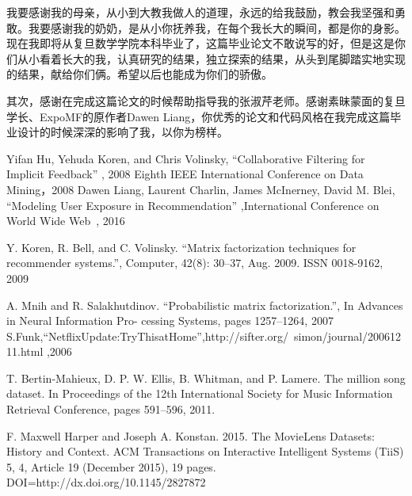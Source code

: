 \documentclass[notitlepage,cs4size,punct,oneside]{ctexrep}
\numberwithin{equation}{chapter}
\theoremstyle{mystyle}
\begin{document}
我要感谢我的母亲，从小到大教我做人的道理，永远的给我鼓励，教会我坚强和勇敢。我要感谢我的奶奶，是从小你抚养我，在每个我长大的瞬间，都是你的身影。现在我即将从复旦数学学院本科毕业了，这篇毕业论文不敢说写的好，但是这是你们从小看着长大的我，认真研究的结果，独立探索的结果，从头到尾脚踏实地实现的结果，献给你们俩。希望以后也能成为你们的骄傲。

\par
其次，感谢在完成这篇论文的时候帮助指导我的张淑芹老师。感谢素昧蒙面的复旦学长、ExpoMF的原作者Dawen Liang，你优秀的论文和代码风格在我完成这篇毕业设计的时候深深的影响了我，以你为榜样。




 \footnotesize
\begin{thebibliography}{99}
 Yifan Hu, Yehuda Koren, and Chris Volinsky, “Collaborative Filtering for Implicit Feedback” , 2008 Eighth IEEE International Conference on Data Mining，2008
 Dawen Liang, Laurent Charlin, James McInerney, David M. Blei, “Modeling User Exposure in Recommendation” ,International Conference on World Wide Web , 2016

 Y. Koren, R. Bell, and C. Volinsky. “Matrix factorization techniques for recommender systems.”, Computer, 42(8): 30–37, Aug. 2009. ISSN 0018-9162, 2009

 A. Mnih and R. Salakhutdinov. “Probabilistic matrix factorization.”, In Advances in Neural Information Pro- cessing Systems, pages 1257–1264, 2007
 S.Funk,“NetflixUpdate:TryThisatHome”,http://sifter.org/~simon/journal/20061211.html ,2006

 T. Bertin-Mahieux, D. P. W. Ellis, B. Whitman, and P. Lamere. The million song dataset. In Proceedings of the 12th International Society for Music Information Retrieval Conference, pages 591–596, 2011.

F. Maxwell Harper and Joseph A. Konstan. 2015. The MovieLens Datasets: History
and Context. ACM Transactions on Interactive Intelligent Systems (TiiS) 5, 4,
Article 19 (December 2015), 19 pages. DOI=http://dx.doi.org/10.1145/2827872

\end{thebibliography}



%
%
\end{document}
